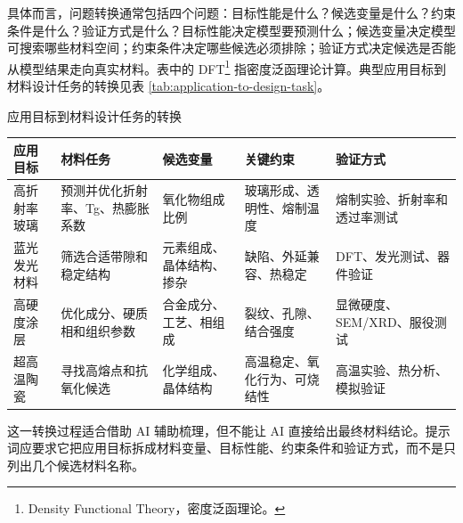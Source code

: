 具体而言，问题转换通常包括四个问题：目标性能是什么？候选变量是什么？约束条件是什么？验证方式是什么？目标性能决定模型要预测什么；候选变量决定模型可搜索哪些材料空间；约束条件决定哪些候选必须排除；验证方式决定候选是否能从模型结果走向真实材料。表中的 DFT\footnote{Density Functional Theory，密度泛函理论。} 指密度泛函理论计算。典型应用目标到材料设计任务的转换见表 \ref{tab:application-to-design-task}。

\begin{formalTable}[htbp]
\caption{应用目标到材料设计任务的转换}
\label{tab:application-to-design-task}
\footnotesize
\begin{tabularx}{\textwidth}{@{}YYYYY@{}}
\toprule
\textbf{应用目标} & \textbf{材料任务} & \textbf{候选变量} & \textbf{关键约束} & \textbf{验证方式} \\
\midrule
高折射率玻璃 & 预测并优化折射率、Tg、热膨胀系数 & 氧化物组成比例 & 玻璃形成、透明性、熔制温度 & 熔制实验、折射率和透过率测试 \\
蓝光发光材料 & 筛选合适带隙和稳定结构 & 元素组成、晶体结构、掺杂 & 缺陷、外延兼容、热稳定 & DFT、发光测试、器件验证 \\
高硬度涂层 & 优化成分、硬质相和组织参数 & 合金成分、工艺、相组成 & 裂纹、孔隙、结合强度 & 显微硬度、SEM/XRD、服役测试 \\
超高温陶瓷 & 寻找高熔点和抗氧化候选 & 化学组成、晶体结构 & 高温稳定、氧化行为、可烧结性 & 高温实验、热分析、模拟验证 \\
\bottomrule
\end{tabularx}
\end{formalTable}

这一转换过程适合借助 AI 辅助梳理，但不能让 AI 直接给出最终材料结论。提示词应要求它把应用目标拆成材料变量、目标性能、约束条件和验证方式，而不是只列出几个候选材料名称。

